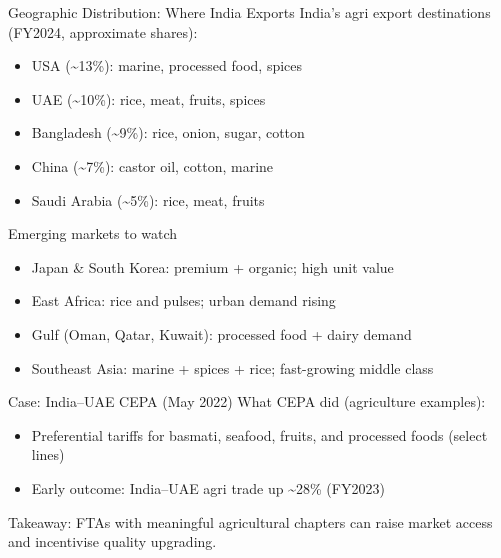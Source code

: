 \documentclass[
  ignorenonframetext,
  aspectratio=169,
]{beamer}
\makeatletter
\providecommand{\tightlist}{%
  \setlength{\itemsep}{0pt}\setlength{\parskip}{0pt}}
\let\quarto@originallabel\label
\DeclareRobustCommand*{\label}[1]{\quarto@originallabel{#1}}
\makeatother
\begin{document}
\begin{frame}
\begin{block}{Geographic Distribution: Where India Exports}
\label{geographic-distribution-where-india-exports}
India's agri export destinations (FY2024, approximate shares):

\begin{itemize}
\tightlist
\item
  USA (\textasciitilde13\%): marine, processed food, spices
\item
  UAE (\textasciitilde10\%): rice, meat, fruits, spices
\item
  Bangladesh (\textasciitilde9\%): rice, onion, sugar, cotton
\item
  China (\textasciitilde7\%): castor oil, cotton, marine
\item
  Saudi Arabia (\textasciitilde5\%): rice, meat, fruits
\end{itemize}

\end{block}
\end{frame}

\begin{frame}
\begin{block}{Emerging markets to watch}
\label{emerging-markets-to-watch}
\begin{itemize}
\tightlist
\item
  Japan \& South Korea: premium + organic; high unit value
\item
  East Africa: rice and pulses; urban demand rising
\item
  Gulf (Oman, Qatar, Kuwait): processed food + dairy demand
\item
  Southeast Asia: marine + spices + rice; fast-growing middle class
\end{itemize}
\end{block}
\end{frame}

\begin{frame}
\begin{block}{Case: India--UAE CEPA (May 2022)}
\label{case-indiauae-cepa-may-2022}
What CEPA did (agriculture examples):

\begin{itemize}
\tightlist
\item
  Preferential tariffs for basmati, seafood, fruits, and processed foods
  (select lines)
\item
  Early outcome: India--UAE agri trade up \textasciitilde28\% (FY2023)
\end{itemize}

Takeaway: FTAs with meaningful agricultural chapters can raise market
access and incentivise quality upgrading.
\end{block}
\end{frame}
\end{document}
